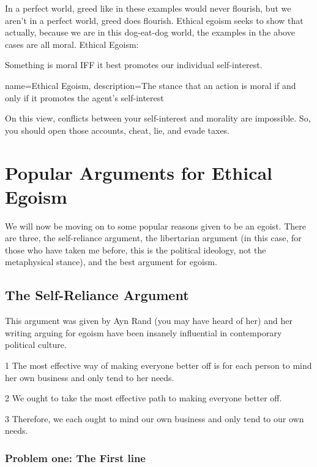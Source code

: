 In a perfect world, greed like in these examples would never flourish, but we aren’t in a perfect world, greed does flourish. Ethical egoism seeks to show that actually, because we are in this dog-eat-dog world, the examples in the above cases are all moral. \gls{Ethical Egoism}:
\begin{center}
Something is moral IFF it best promotes our individual self-interest.
\end{center}

{
  name=Ethical Egoism,
  description={The stance that an action is moral if and only if it promotes the agent's self-interest}
}


On this view, conflicts between your self-interest and morality are impossible. So, you should open those accounts, cheat, lie, and evade taxes.

\section{Popular Arguments for Ethical Egoism}

We will now be moving on to some popular reasons given to be an egoist. There are three, the self-reliance argument, the libertarian argument (in this case, for those who have taken me before, this is the political ideology, not the metaphysical stance), and the best argument for egoism.

\subsection{The Self-Reliance Argument}

This argument was given by Ayn Rand (you may have heard of her) and her writing arguing for egoism have been insanely influential in contemporary political culture.

\begin{earg}
\item[1] The most effective way of making everyone better off is for each person to mind her own business and only tend to her needs.
\item[2] We ought to take the most effective path to making everyone better off.
\item[3] Therefore, we each ought to mind our own business and only tend to our own needs.
\end{earg}

\subsubsection{Problem one: The First line}

